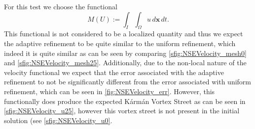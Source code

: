 \begin{test} \label{tst:Velocity}
    For this test we choose the functional
    \begin{equation}
        M(U) := \int_I\! \int_{\Omega}\! u\, d\mathbf{x}\, dt.
        \label{eq:VelocityFunctional}
    \end{equation}
    This functional is not considered to be a localized quantity and thus we
    expect the adaptive refinement to be quite similar to the uniform
    refinement, which indeed it is quite similar as can be seen by comparing
    \autoref{sfig:NSEVelocity_mesh0} and \autoref{sfig:NSEVelocity_mesh25}.
    Additionally, due to the non-local nature of the velocity functional
    we expect that the error associated with the adaptive refinement to
    not be significantly different from the error associated with
    uniform refinement, which can be seen in \autoref{fig:NSEVelocity_err}.
    However, this functionally does produce the expected K\'arm\'an Vortex
    Street as can be seen in \autoref{sfig:NSEVelocity_u25}, however this vortex
    street is not present in the initial solution (see
    \autoref{sfig:NSEVelocity_u0}.


\end{test}
